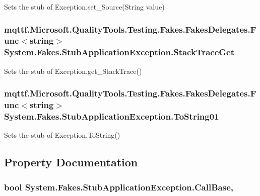 Sets the stub of Exception.\-set\-\_\-\-Source(\-String value)

\hypertarget{class_system_1_1_fakes_1_1_stub_application_exception_a7633f1d0b9442cdbd4df14cf8681335f}{
\subsubsection[{Stack\-Trace\-Get}]{\setlength{\rightskip}{0pt plus 5cm}mqttf.\-Microsoft.\-Quality\-Tools.\-Testing.\-Fakes.\-Fakes\-Delegates.\-Func$<$string$>$ System.\-Fakes.\-Stub\-Application\-Exception.\-Stack\-Trace\-Get}}\label{class_system_1_1_fakes_1_1_stub_application_exception_a7633f1d0b9442cdbd4df14cf8681335f}


Sets the stub of Exception.\-get\-\_\-\-Stack\-Trace()

\hypertarget{class_system_1_1_fakes_1_1_stub_application_exception_a65ece42936897568f787c97344347bf4}{
\subsubsection[{To\-String01}]{\setlength{\rightskip}{0pt plus 5cm}mqttf.\-Microsoft.\-Quality\-Tools.\-Testing.\-Fakes.\-Fakes\-Delegates.\-Func$<$string$>$ System.\-Fakes.\-Stub\-Application\-Exception.\-To\-String01}}\label{class_system_1_1_fakes_1_1_stub_application_exception_a65ece42936897568f787c97344347bf4}


Sets the stub of Exception.\-To\-String()



\subsection{Property Documentation}
\hypertarget{class_system_1_1_fakes_1_1_stub_application_exception_adba3b8386525474c1e243c23afe6e6d4}{
\subsubsection[{Call\-Base}]{\setlength{\rightskip}{0pt plus 5cm}bool System.\-Fakes.\-Stub\-Application\-Exception.\-Call\-Base\hspace{0.3cm}{\ttfamily [get]}, {\ttfamily [set]}}}\label{class_system_1_1_fakes_1_1_stub_application_exception_adba3b8386525474c1e243c23afe6e6d4}



